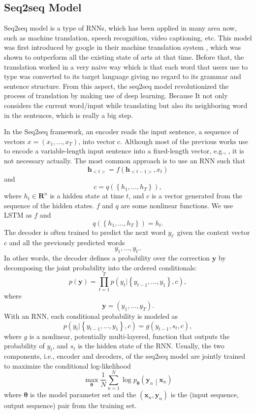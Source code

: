 \subsection{Seq2seq Model}

Seq2seq model is a type of RNNs, which has been applied in many area now, such as machine translation, speech recognition, video captioning, etc. This model was first introduced by google in their machine translation system \cite{sutskever2014sequence}, which was shown to outperform all the existing state of arts at that time. Before that, the translation worked in a very naive way which is that each word that users use to type was converted to its target language giving no regard to its grammar and sentence structure. From this aspect, the seq2seq model revolutionized the process of translation by making use of deep learning. Because It not only considers the current word/input while translating but also its neighboring word in the sentences, which is really a big step.

In the Seq2seq framework, an encoder reads the input sentence, a sequence of vectors $x=\left(x_1,\ldots,x_T\right)$, into vector c. Although most of the previous works use to encode a variable-length input sentence into a fixed-length vector, e.g., \cite{cho2014learning}, it is not necessary actually. The most common approach is to use an RNN such that
$$\mathbf{h}_{<t>}=f\left(\mathbf{h}_{<t-1>},x_t\right)$$
and
$$c=q\left(\left\{h_1,\ldots,h_T\right\}\right),$$
where $h_t\in\mathbf{R}^n$  is a hidden state at time $t$, and $c$ is a vector generated from the sequence of the hidden states. $f$ and $q$ are some nonlinear functions. We use LSTM as $f$ and 
$$q\left(\left\{h_1,\ldots,h_T\right\}\right)=h_t.$$
The decoder is often trained to predict the next word $y_{t’}$ given the context vector $c$ and all the previously predicted words 
$$y_1,\ldots,y_{t’}.$$
In other words, the decoder defines a probability over the correction $\mathbf{y}$ by decomposing the joint probability into the ordered conditionals:
$$p\left(\mathbf{y}\right)=\prod_{t=1}^{T}{p\left(y_t|\left\{y_{t-1},\ldots,y_1\right\},c\right)},$$
where 
$$\mathbf{y}=(y_1,\ldots,y_T).$$
With an RNN, each conditional probability is modeled as
$$p\left(y_t|\left\{y_{t-1},\ldots,y_1\right\},c\right)=g\left(y_{t-1},s_t,c\right),$$
where $g$ is a nonlinear, potentially multi-layered, function that outputs the probability of $y_t$, and $s_t$ is the hidden state of the RNN.
Usually, the two components, i.e., encoder and decoders, of the seq2seq model are jointly trained to maximize the conditional log-likelihood
$$\max_\mathbf{\theta}{\frac{1}{N}\sum_{n=1}^{N}{\log{p_\mathbf{\theta}}\left(\mathbf{y}_n\middle|\mathbf{x}_n\right)}}$$
where $\mathbf{\theta}$ is the model parameter set and the $(\mathbf{x}_n,\mathbf{y}_n)$ is the (input sequence, output sequence) pair from the training set.

